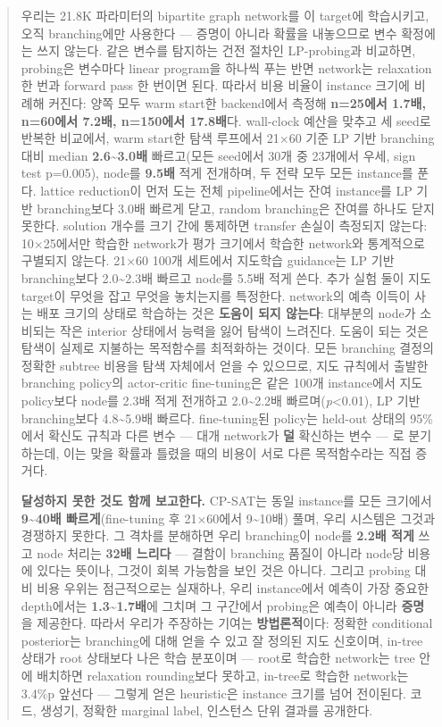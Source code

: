 \documentclass[final,5p,twocolumn]{elsarticle}
\begin{document}
\begin{frontmatter}
\begin{abstract}
우리는 21.8K 파라미터의 bipartite graph network를 이 target에 학습시키고, 오직 branching에만 사용한다 — 증명이 아니라 확률을 내놓으므로 변수 확정에는 쓰지 않는다. 같은 변수를 탐지하는 건전 절차인 LP-probing과 비교하면, probing은 변수마다 linear program을 하나씩 푸는 반면 network는 relaxation 한 번과 forward pass 한 번이면 된다. 따라서 비용 비율이 instance 크기에 비례해 커진다: 양쪽 모두 warm start한 backend에서 측정해 \textbf{n=25에서 1.7배, n=60에서 7.2배, n=150에서 17.8배}다. wall-clock 예산을 맞추고 세 seed로 반복한 비교에서, warm start한 탐색 루프에서 21×60 기준 LP 기반 branching 대비 median \textbf{2.6\textasciitilde{}3.0배} 빠르고(모든 seed에서 30개 중 23개에서 우세, sign test p=0.005), node를 \textbf{9.5배} 적게 전개하며, 두 전략 모두 모든 instance를 푼다. lattice reduction이 먼저 도는 전체 pipeline에서는 잔여 instance를 LP 기반 branching보다 3.0배 빠르게 닫고, random branching은 잔여를 하나도 닫지 못한다. solution 개수를 크기 간에 통제하면 transfer 손실이 측정되지 않는다: 10×25에서만 학습한 network가 평가 크기에서 학습한 network와 통계적으로 구별되지 않는다. 21×60 100개 세트에서 지도학습 guidance는 LP 기반 branching보다 2.0\textasciitilde{}2.3배 빠르고 node를 5.5배 적게 쓴다. 추가 실험 둘이 지도 target이 무엇을 잡고 무엇을 놓치는지를 특정한다. network의 예측 이득이 사는 배포 크기의 상태로 학습하는 것은 \textbf{도움이 되지 않는다}: 대부분의 node가 소비되는 작은 interior 상태에서 능력을 잃어 탐색이 느려진다. 도움이 되는 것은 탐색이 실제로 지불하는 목적함수를 최적화하는 것이다. 모든 branching 결정의 정확한 subtree 비용을 탐색 자체에서 얻을 수 있으므로, 지도 규칙에서 출발한 branching policy의 actor-critic fine-tuning은 같은 100개 instance에서 지도 policy보다 node를 2.3배 적게 전개하고 2.0\textasciitilde{}2.2배 빠르며(\textit{p}<0.01), LP 기반 branching보다 4.8\textasciitilde{}5.9배 빠르다. fine-tuning된 policy는 held-out 상태의 95\%에서 확신도 규칙과 다른 변수 — 대개 network가 \textbf{덜} 확신하는 변수 — 로 분기하는데, 이는 맞을 확률과 틀렸을 때의 비용이 서로 다른 목적함수라는 직접 증거다.

\textbf{달성하지 못한 것도 함께 보고한다.} CP-SAT는 동일 instance를 모든 크기에서 \textbf{9\textasciitilde{}40배 빠르게}(fine-tuning 후 21×60에서 9\textasciitilde{}10배) 풀며, 우리 시스템은 그것과 경쟁하지 못한다. 그 격차를 분해하면 우리 branching이 node를 \textbf{2.2배 적게} 쓰고 node 처리는 \textbf{32배 느리다} — 결함이 branching 품질이 아니라 node당 비용에 있다는 뜻이나, 그것이 회복 가능함을 보인 것은 아니다. 그리고 probing 대비 비용 우위는 점근적으로는 실재하나, 우리 instance에서 예측이 가장 중요한 depth에서는 \textbf{1.3\textasciitilde{}1.7배}에 그치며 그 구간에서 probing은 예측이 아니라 \textbf{증명}을 제공한다. 따라서 우리가 주장하는 기여는 \textbf{방법론적}이다: 정확한 conditional posterior는 branching에 대해 얻을 수 있고 잘 정의된 지도 신호이며, in-tree 상태가 root 상태보다 나은 학습 분포이며 — root로 학습한 network는 tree 안에 배치하면 relaxation rounding보다 못하고, in-tree로 학습한 network는 3.4\%p 앞선다 — 그렇게 얻은 heuristic은 instance 크기를 넘어 전이된다. 코드, 생성기, 정확한 marginal label, 인스턴스 단위 결과를 공개한다.
\end{abstract}


\end{frontmatter}
\end{document}
